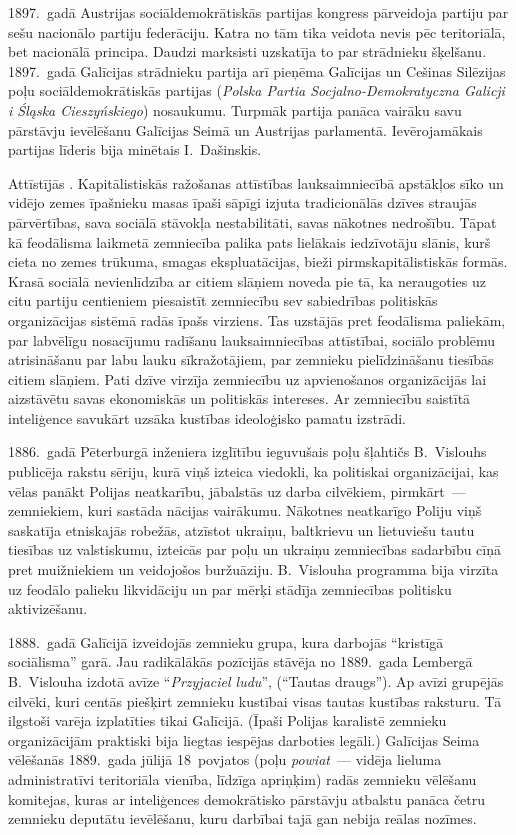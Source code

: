 \documentclass[twoside,a5paper,12pt,fleqn,openany]{extbook}
\newcommand{\pltxti}[1]{\textit{\textpolish{#1}}}
\begin{document}
1897.~gadā Austrijas sociāldemokrātiskās partijas kongress pārveidoja partiju par sešu nacionālo partiju federāciju. Katra no tām tika veidota nevis pēc teritoriālā, bet nacionālā principa. Daudzi marksisti uzskatīja to par strādnieku šķelšanu. 1897.~gadā Galīcijas strādnieku partija arī pieņēma Galīcijas un Cešinas Silēzijas poļu sociāldemokrātiskās partijas (\pltxti{Polska Partia Socjalno-Demokratyczna Galicji i Śląska Cieszyńskiego}) nosaukumu. Turpmāk partija panāca vairāku savu pārstāvju ievēlēšanu Galīcijas Seimā un Austrijas parlamentā. Ievērojamākais partijas līderis bija minētais I.~Dašinskis.

Attīstījās . Kapitālistiskās ražošanas attīstības lauksaimniecībā apstākļos sīko un vidējo zemes īpašnieku masas īpaši sāpīgi izjuta tradicionālās dzīves straujās pārvērtības, sava sociālā stāvokļa nestabilitāti, savas nākotnes nedrošību. Tāpat kā feodālisma laikmetā zemniecība palika pats lielākais iedzīvotāju slānis, kurš cieta no zemes trūkuma, smagas ekspluatācijas, bieži pirmskapitālistiskās formās. Krasā sociālā nevienlīdzība ar citiem slāņiem noveda pie tā, ka neraugoties uz citu partiju centieniem piesaistīt zemniecību sev sabiedrības politiskās organizācijas sistēmā radās īpašs virziens. Tas uzstājās pret feodālisma paliekām, par labvēlīgu nosacījumu radīšanu lauksaimniecības attīstībai, sociālo problēmu atrisināšanu par labu lauku sīkražotājiem, par zemnieku pielīdzināšanu tiesībās citiem slāņiem. Pati dzīve virzīja zemniecību uz apvienošanos organizācijās lai aizstāvētu savas ekonomiskās un politiskās intereses. Ar zemniecību saistītā inteliģence savukārt uzsāka kustības ideoloģisko pamatu izstrādi.

1886.~gadā Pēterburgā inženiera izglītību ieguvušais poļu šļahtičs B.~Vislouhs publicēja rakstu sēriju, kurā viņš izteica viedokli, ka politiskai organizācijai, kas vēlas panākt Polijas neatkarību, jābalstās uz darba cilvēkiem, pirmkārt~--- zemniekiem, kuri sastāda nācijas vairākumu. Nākotnes neatkarīgo Poliju viņš saskatīja etniskajās robežās, atzīstot ukraiņu, baltkrievu un lietuviešu tautu tiesības uz valstiskumu, izteicās par poļu un ukraiņu zemniecības sadarbību cīņā pret muižniekiem un veidojošos buržuāziju. B.~Vislouha programma bija virzīta uz feodālo palieku likvidāciju un par mērķi stādīja zemniecības politisku aktivizēšanu.

1888.~gadā Galīcijā izveidojās zemnieku grupa, kura darbojās ``kristīgā sociālisma'' garā. Jau radikālākās pozīcijās stāvēja no 1889.~gada Lembergā B.~Vislouha izdotā avīze ``\pltxti{Przyjaciel ludu}'', (``Tautas draugs''). Ap avīzi grupējās cilvēki, kuri centās piešķirt zemnieku kustībai visas tautas kustības raksturu. Tā ilgstoši varēja izplatīties tikai Galīcijā. (Īpaši Polijas karalistē zemnieku organizācijām praktiski bija liegtas iespējas darboties legāli.) Galīcijas Seima vēlēšanās 1889.~gada jūlijā 18~povjatos (poļu \pltxti{powiat}~--- vidēja lieluma administratīvi teritoriāla vienība, līdzīga apriņķim) radās zemnieku vēlēšanu komitejas, kuras ar inteliģences demokrātisko pārstāvju atbalstu panāca četru zemnieku deputātu ievēlēšanu, kuru darbībai tajā gan nebija reālas nozīmes.
\end{document}
